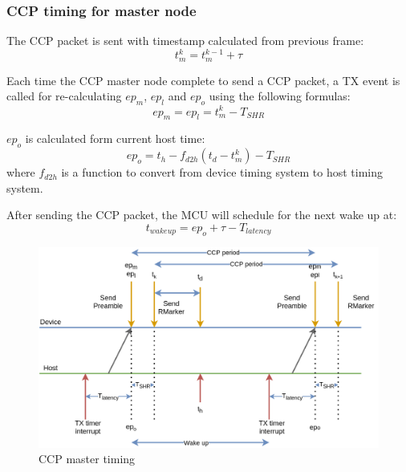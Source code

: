\documentclass[\main/thesis.tex]{subfiles}
\begin{document}
\subsubsection{CCP timing for master node}

The CCP packet is sent with timestamp calculated from previous frame:
\begin{equation}
    t^k_m = t^{k-1}_m + \tau
\end{equation}

Each time the CCP master node complete to send a CCP packet, a TX event is called for re-calculating $ep_m$, $ep_l$ and $ep_o$ using the following formulas:
\begin{equation}
    ep_m = ep_l = t^k_m - T_{SHR}
\end{equation}

$ep_o$ is calculated form current host time:
\begin{equation}
    ep_o = t_h - f_{d2h}(t_d - t^k_m) - T_{SHR}
\end{equation}
where $f_{d2h}$ is a function to convert from device timing system to host timing system.

After sending the CCP packet, the MCU will schedule for the next wake up at:
\begin{equation}
    t_{wake up} = ep_o + \tau - T_{latency}
\end{equation}

\begin{figure}[H]
    \begin{center}
        \includegraphics[width=1\textwidth]{ccp_timing_for_master_node.png}
    \end{center}
    \caption{CCP master timing}
    \label{fig:interupt_latency_master}
\end{figure}
\end{document}
